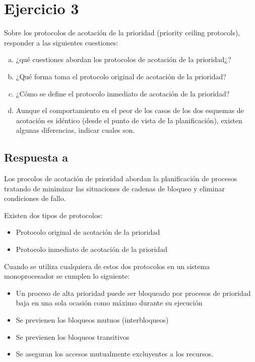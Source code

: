 \section{Ejercicio 3}

Sobre los protocolos de acotación de la prioridad (priority ceiling protocols),
responder a las siguientes cuestiones:
\begin{enumerate}[a)]
	\item ¿qué cuestiones abordan los protocolos de acotación de la
		prioridad¿?
	\item ¿Qué forma toma el protocolo original de acotación de la prioridad?
	\item ¿Cómo se define el protocolo inmediato de acotación de la prioridad?
	\item Aunque el comportamiento en el peor de los casos de los dos 
		esquemas de acotación es idéntico (desde el punto de vista de la 
		planificación), existen algunas diferencias, indicar cuales son.

\end{enumerate}

\subsection{Respuesta a}

Los procolos de acotación de prioridad abordan la planificación de procesos
tratando de minimizar las situaciones de cadenas de bloqueo y eliminar
condiciones de fallo.

Existen dos tipos de protocolos:

\begin{itemize}
	\item Protocolo original de acotación de la prioridad
	\item Protocolo inmediato de acotación de la prioridad
\end{itemize}

Cuando se utiliza cualquiera de estos dos protocolos en un sistema
monoprocesador se cumplen lo siguiente:

\begin{itemize}
	\item Un proceso de alta prioridad puede ser bloqueado por procesos de
		prioridad baja en una sola ocasión como máximo durante su
		ejecución
	\item Se previenen los bloqueos mutuos (interbloqueos)
	\item Se previenen los bloqueos transitivos
	\item Se aseguran los accesos mutualmente excluyentes a los recursos.
\end{itemize}

